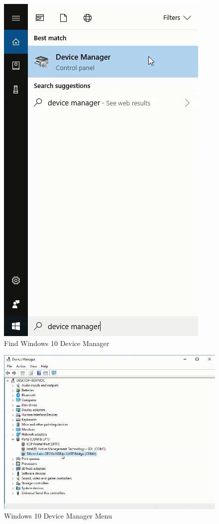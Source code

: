\documentclass{book}
\makeatletter
\def\maxwidth{\ifdim\Gin@nat@width>\linewidth\linewidth
    \else\Gin@nat@width\fi}
\let\Oldincludegraphics\includegraphics
\renewcommand{\includegraphics}[1]{\Oldincludegraphics[width=.8\maxwidth]{#1}}
\makeatother
\begin{document}
\begin{figure}
\centering
\includegraphics{images/find_device_manager.png}
\caption{Find Windows 10 Device Manager}
\end{figure}

\begin{figure}
\centering
\includegraphics{images/device_manager_menu.png}
\caption{Windows 10 Device Manager Menu}
\end{figure}
    
\end{document}
